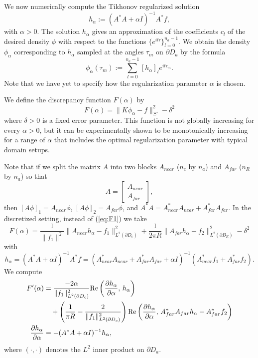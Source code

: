 \documentclass[11pt]{amsart}
\theoremstyle{definition}
\theoremstyle{definition}
\theoremstyle{definition}
\newcommand{\paren}[1]{\left ( #1\right )}
\newcommand{\re}{\textrm{Re}}
\begin{document}
We now numerically compute the Tikhonov regularized solution
\begin{equation*}
h_{\alpha} := (A^{*}A + \alpha I)^{-1}A^{*}f,
\end{equation*}
with $\alpha > 0$. The solution $h_{\alpha}$ gives an approximation of the coefficients $c_{l}$ of the desired density $\phi$ with respect to the functions $\{e^{il\tau}\}_{l=0}^{n_{a}-1}$. We obtain the density $\phi_{\alpha}$ corresponding to $h_{\alpha}$ sampled at the angles $\tau_{m}$ on $\partial D_{a}$ by the formula
\begin{equation*}
\phi_{\alpha}(\tau_{m}) := \sum_{l=0}^{n_{a}-1}[h_{\alpha}]_{l}e^{il\tau_{m}}.
\end{equation*}
Note that we have yet to specify how the regularization parameter $\alpha$ is chosen.

We define the discrepancy function $F(\alpha)$ by
\begin{equation}
F(\alpha) = \|K\phi_{\alpha} - f\|_{\Xi'}^{2} - \delta^{2} \label{eq:F}
\end{equation}
where $\delta > 0$ is a fixed error parameter. This function is not globally increasing for every $\alpha > 0$, but it can be experimentally shown to be monotonically increasing for a range of $\alpha$ that includes the optimal regularization parameter with typical domain setups.

Note that if we split the matrix $A$ into two blocks $A_{near}$ ($n_{c}$ by $n_{a}$) and $A_{far}$ ($n_{R}$ by $n_{a}$) so that
\begin{equation*}
A = \left[ \begin{array}{c}
A_{near}\\
A_{far}
\end{array}\right],
\end{equation*}
then $[A\phi]_{1} = A_{near}\phi$, $[A\phi]_{2} = A_{far}\phi$, and $A^{*}A = A_{near}^{*}A_{near} + A_{far}^{*}A_{far}$. In the discretized setting, instead of (\ref{eq:F1}) we take
\begin{equation}
F(\alpha) =\frac{1}{\|f_{1}\|^{2}} \|A_{near}h_{\alpha} - f_{1}\|_{L^{2}(\partial D_{c})}^{2} + \frac{1}{2\pi R}\|A_{far}h_{\alpha} - f_{2}\|_{L^{2}(\partial B_{R})}^{2} - \delta^{2}
\end{equation}
with
\begin{equation}
h_{\alpha} = (A^{*}A + \alpha I)^{-1}A^{*}f = (A_{near}^{*}A_{near} + A_{far}^{*}A_{far} + \alpha I)^{-1}\paren{A_{near}^{*}f_{1} + A_{far}^{*}f_{2}}.
\end{equation}
We compute
\begin{align}
F'(\alpha) & = \frac{-2\alpha}{\|f_{1}\|_{L^{2}(\partial D_{c})}^{2}}\re\paren{\frac{\partial h_{\alpha}}{\partial \alpha}, \, h_{\alpha}} \notag\\
& \quad + \paren{ \frac{1}{\pi R} - \frac{2}{\|f_{1}\|_{L^{2}(\partial D_{c})}^{2}}}\re\paren{\frac{\partial h_{\alpha}}{\partial \alpha}, \, A_{far}^{*}A_{far}h_{\alpha} - A_{far}^{*}f_{2}} \label{eq:dF1}\\
\frac{\partial h_{\alpha}}{\partial \alpha} & = -(A^{*}A + \alpha I)^{-1}h_{\alpha}, \label{eq:dF2}
\end{align}
where $( \cdot, \cdot )$ denotes the $L^{2}$ inner product on $\partial D_{a}$.
\end{document}
